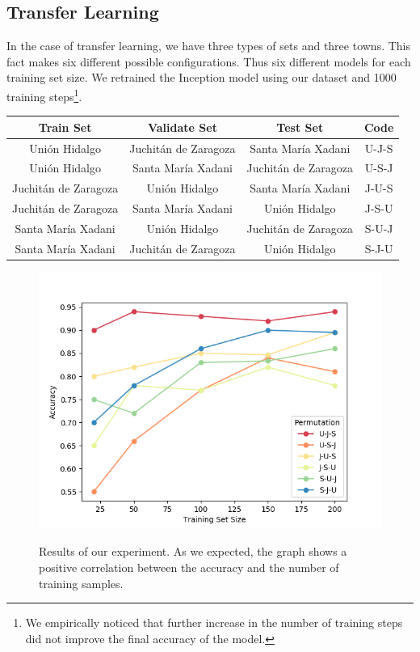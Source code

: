 \subsection{Transfer Learning}

In the case of transfer learning, we have three types of sets and three towns. This fact makes six different possible configurations. Thus six different models for each training set size. We retrained the Inception model using our dataset and 1000 training steps\footnote{We empirically noticed that further increase in the number of training steps did not improve the final accuracy of the model.}.\\

\begin{center}
  \begin{tabular}{|c|c|c|c|}
    \hline
    Train Set              &Validate Set           &Test Set               &Code  \\ \hline
    Uni\'on Hidalgo        &Juchit\'an de Zaragoza &Santa Mar\'ia Xadani   &U-J-S \\ \hline
    Uni\'on Hidalgo        &Santa Mar\'ia Xadani   &Juchit\'an de Zaragoza &U-S-J \\ \hline
    Juchit\'an de Zaragoza &Uni\'on Hidalgo        &Santa Mar\'ia Xadani   &J-U-S \\ \hline
    Juchit\'an de Zaragoza &Santa Mar\'ia Xadani   &Uni\'on Hidalgo        &J-S-U \\ \hline
    Santa Mar\'ia Xadani   &Uni\'on Hidalgo        &Juchit\'an de Zaragoza &S-U-J \\ \hline
    Santa Mar\'ia Xadani   &Juchit\'an de Zaragoza &Uni\'on Hidalgo        &S-J-U \\
    \hline
  \end{tabular}
\end{center}


\begin{figure}[h]
  \centering
  \includegraphics[width=1\textwidth]{images/validation-plot.png}
  \label{fig:validaton-plot}
  \caption{Results of our experiment. As we expected, the graph shows a positive correlation between the accuracy and the number of training samples.}
\end{figure}


